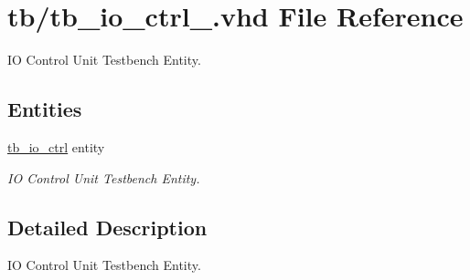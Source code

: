 \hypertarget{tb__io__ctrl___8vhd}{}\section{tb/tb\+\_\+io\+\_\+ctrl\+\_\+.vhd File Reference}
\label{tb__io__ctrl___8vhd}


IO Control Unit Testbench Entity.  


\subsection*{Entities}
\begin{DoxyCompactItemize}
\item 
\hyperlink{classtb__io__ctrl}{tb\+\_\+io\+\_\+ctrl} entity
\begin{DoxyCompactList}\small\item\em IO Control Unit Testbench Entity. \end{DoxyCompactList}\end{DoxyCompactItemize}


\subsection{Detailed Description}
IO Control Unit Testbench Entity. 

